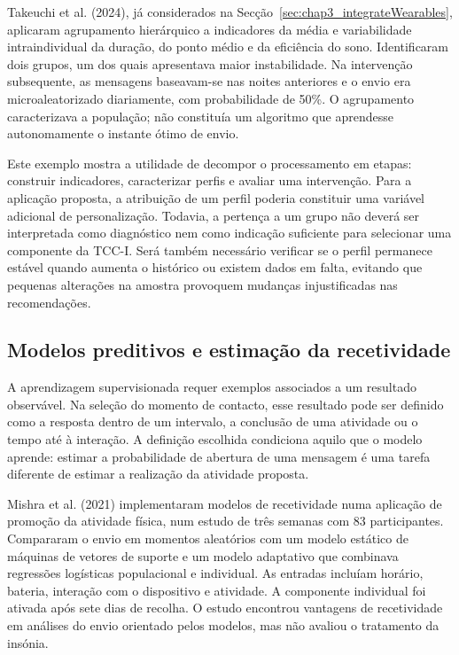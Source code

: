 Takeuchi et al. (2024), já considerados na Secção~\ref{sec:chap3_integrateWearables}, aplicaram agrupamento hierárquico a indicadores da média e variabilidade intraindividual da duração, do ponto médio e da eficiência do sono. Identificaram dois grupos, um dos quais apresentava maior instabilidade. Na intervenção subsequente, as mensagens baseavam-se nas noites anteriores e o envio era microaleatorizado diariamente, com probabilidade de 50\%. O agrupamento caracterizava a população; não constituía um algoritmo que aprendesse autonomamente o instante ótimo de envio.

Este exemplo mostra a utilidade de decompor o processamento em etapas: construir indicadores, caracterizar perfis e avaliar uma intervenção. Para a aplicação proposta, a atribuição de um perfil poderia constituir uma variável adicional de personalização. Todavia, a pertença a um grupo não deverá ser interpretada como diagnóstico nem como indicação suficiente para selecionar uma componente da TCC-I. Será também necessário verificar se o perfil permanece estável quando aumenta o histórico ou existem dados em falta, evitando que pequenas alterações na amostra provoquem mudanças injustificadas nas recomendações.

\subsection{Modelos preditivos e estimação da recetividade}
\label{sec:chap3_receptivityPrediction}

A aprendizagem supervisionada requer exemplos associados a um resultado observável. Na seleção do momento de contacto, esse resultado pode ser definido como a resposta dentro de um intervalo, a conclusão de uma atividade ou o tempo até à interação. A definição escolhida condiciona aquilo que o modelo aprende: estimar a probabilidade de abertura de uma mensagem é uma tarefa diferente de estimar a realização da atividade proposta.

Mishra et al. (2021) implementaram modelos de recetividade numa aplicação de promoção da atividade física, num estudo de três semanas com 83 participantes. Compararam o envio em momentos aleatórios com um modelo estático de máquinas de vetores de suporte e um modelo adaptativo que combinava regressões logísticas populacional e individual. As entradas incluíam horário, bateria, interação com o dispositivo e atividade. A componente individual foi ativada após sete dias de recolha. O estudo encontrou vantagens de recetividade em análises do envio orientado pelos modelos, mas não avaliou o tratamento da insónia.

